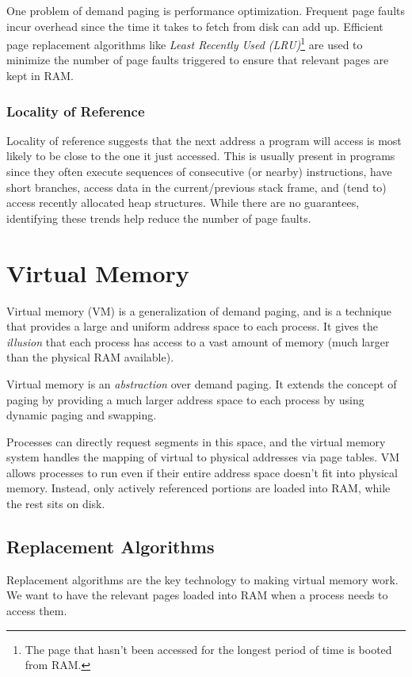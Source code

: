 \documentclass{report}
\newcommand{\abstractionBegin}[1]{\begin{tcolorbox}[colback=violet!5!white,colframe=violet,title={Abstraction:
      #1}]}
\newcommand{\abstractionEnd}{\end{tcolorbox}}
\begin{document}
One problem of demand paging is performance optimization. Frequent page faults incur overhead since
the time it takes to fetch from disk can add up. Efficient page replacement algorithms like
\textit{Least Recently Used (LRU)}\footnote{The page that hasn't been accessed for the longest
  period of time is booted from RAM.} are used to minimize the number of page faults triggered to
ensure that relevant pages are kept in RAM.

\subsection{Locality of Reference}
Locality of reference suggests that the next address a program will access is most likely to be
close to the one it just accessed. This is usually present in programs since they often execute
sequences of consecutive (or nearby) instructions, have short branches, access data in the
current/previous stack frame, and (tend to) access recently allocated heap structures. While there
are no guarantees, identifying these trends help reduce the number of page faults.





\chapter{Virtual Memory}
Virtual memory (VM) is a generalization of demand paging, and is a technique that provides a large
and uniform address space to each process. It gives the \textit{illusion} that each process has
access to a vast amount of memory (much larger than the physical RAM available).

\abstractionBegin{Virtual Memory and Paging}
Virtual memory is an \textit{abstraction} over demand paging. It extends the concept of paging by
providing a much larger address space to each process by using dynamic paging and swapping.
\abstractionEnd

Processes can directly request segments in this space, and the virtual memory system handles the
mapping of virtual to physical addresses via page tables. VM allows processes to run even if their
entire address space doesn't fit into physical memory. Instead, only actively referenced portions
are loaded into RAM, while the rest sits on disk.

\section{Replacement Algorithms}
Replacement algorithms are the key technology to making virtual memory work. We want to have the
relevant pages loaded into RAM when a process needs to access them.
\end{document}
